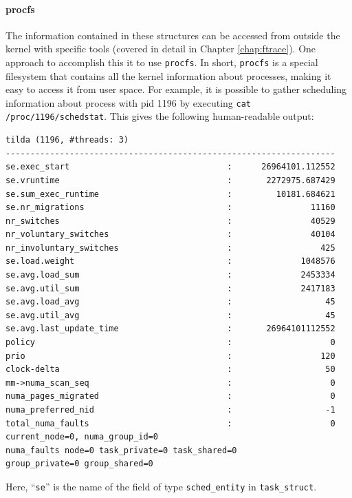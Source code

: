 \paragraph{procfs}
The information contained in these structures can be accessed from outside the kernel with specific tools (covered in detail in Chapter \ref{chap:ftrace}). One approach to accomplish this it to use \verb|procfs|. In short, \verb|procfs| is a special filesystem that contains all the kernel information about processes, making it easy to access it from user space. For example, it is possible to gather scheduling information about process with pid 1196 by executing \verb|cat /proc/1196/schedstat|. This gives the following human-readable output:

\begin{verbatim}
tilda (1196, #threads: 3)
-------------------------------------------------------------------
se.exec_start                                :      26964101.112552
se.vruntime                                  :       2272975.687429
se.sum_exec_runtime                          :         10181.684621
se.nr_migrations                             :                11160
nr_switches                                  :                40529
nr_voluntary_switches                        :                40104
nr_involuntary_switches                      :                  425
se.load.weight                               :              1048576
se.avg.load_sum                              :              2453334
se.avg.util_sum                              :              2417183
se.avg.load_avg                              :                   45
se.avg.util_avg                              :                   45
se.avg.last_update_time                      :       26964101112552
policy                                       :                    0
prio                                         :                  120
clock-delta                                  :                   50
mm->numa_scan_seq                            :                    0
numa_pages_migrated                          :                    0
numa_preferred_nid                           :                   -1
total_numa_faults                            :                    0
current_node=0, numa_group_id=0
numa_faults node=0 task_private=0 task_shared=0 
group_private=0 group_shared=0
\end{verbatim}
Here, ``\verb|se|'' is the name of the field of type \verb|sched_entity| in \verb|task_struct|.

